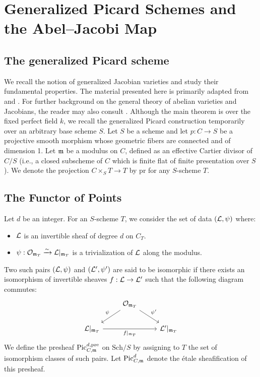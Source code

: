 \section{Generalized Picard Schemes and the Abel--Jacobi Map}\label{section:generalized-picard-and-abel-jacobi}

\subsection{The generalized Picard scheme}
We recall the notion of generalized Jacobian varieties and study their fundamental properties. The material presented here is primarily adapted from \cite{Guignard2018} and \cite{takeuchi2019blow}. For further background on the general theory of abelian varieties and Jacobians, the reader may also consult \cite{milneAV}.
Although the main theorem is over the fixed perfect field $k$, we recall the
generalized Picard construction temporarily over an arbitrary base scheme
$S$.
Let $S$ be a scheme and let $p:C\to S$ be a projective smooth morphism whose geometric fibers are connected and of dimension 1. Let $\mdls$ be a modulus on $C$, defined as an effective Cartier divisor of $C/S$ 
(i.e., a closed subscheme of $C$ which is finite flat of finite presentation over $S$).
We denote the projection $C \times_S T \to T$ by $\text{pr}$ for any $S$-scheme $T$.

\subsection*{The Functor of Points}
Let $d$ be an integer. For an $S$-scheme $T$, we consider the set of data $(\cL, \psi)$ where:
\begin{itemize}
    \item $\cL$ is an invertible sheaf of degree $d$ on $C_T$.
    \item $\psi: \Oo_{\mdls_T} \xrightarrow{\sim} \cL|_{\mdls_T}$ is a trivialization of $\cL$ along the modulus.
\end{itemize}
Two such pairs $(\cL, \psi)$ and $(\cL', \psi')$ are said to be isomorphic if there exists an isomorphism of invertible sheaves $f : \cL \to \cL'$ such that the following diagram commutes:
\[
\begin{tikzcd}
& \Oo_{\mdls_T} \arrow[dl, "\psi"'] \arrow[dr, "\psi'"] & \\
\cL|_{\mdls_T} \arrow[rr, "f|_{\mdls_T}"'] & & \cL'|_{\mdls_T}
\end{tikzcd}
\]
We define the presheaf $\text{Pic}_{C, \mdls}^{d, \text{pre}}$ on $\text{Sch}/S$ by assigning to $T$ the set of isomorphism classes of such pairs. Let $\PicCm[d]$ denote the \'etale sheafification of this presheaf.

